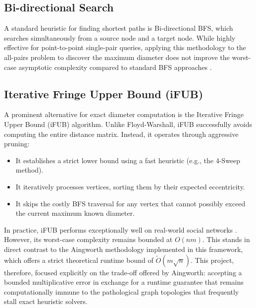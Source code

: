\subsection{Bi-directional Search}
A standard heuristic for finding shortest paths is Bi-directional BFS, which searches simultaneously from a source node and a target node. While highly effective for point-to-point single-pair queries, applying this methodology to the all-pairs problem to discover the maximum diameter does not improve the worst-case asymptotic complexity compared to standard BFS approaches \cite{westGraphTheory}.

\subsection{Iterative Fringe Upper Bound (iFUB)}
A prominent alternative for exact diameter computation is the Iterative Fringe Upper Bound (iFUB) algorithm. Unlike Floyd-Warshall, iFUB successfully avoids computing the entire distance matrix. Instead, it operates through aggressive pruning:
\begin{itemize}
    \item It establishes a strict lower bound using a fast heuristic (e.g., the 4-Sweep method).
    \item It iteratively processes vertices, sorting them by their expected eccentricity.
    \item It skips the costly BFS traversal for any vertex that cannot possibly exceed the current maximum known diameter.
\end{itemize}
In practice, iFUB performs exceptionally well on real-world social networks \cite{ifub}. However, its worst-case complexity remains bounded at $O(nm)$. This stands in direct contrast to the Aingworth methodology implemented in this framework, which offers a strict theoretical runtime bound of $\tilde{O}(m\sqrt{n})$. This project, therefore, focused explicitly on the trade-off offered by Aingworth: accepting a bounded multiplicative error in exchange for a runtime guarantee that remains computationally immune to the pathological graph topologies that frequently stall exact heuristic solvers.